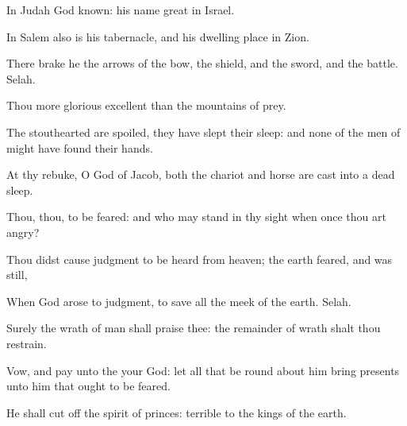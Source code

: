 {\Q {}In
Judah
{}
God
known: his
name
{}
great in
Israel.


\par }{\Q {}In
Salem also is his
tabernacle, and his dwelling
place in
Zion.


\par }{\Q {}There
brake he the
arrows of the
bow, the
shield, and the
sword, and the
battle.
Selah.


\par }{\Q {}Thou
{} more
glorious
{}
excellent than the
mountains of
prey.


\par }{\Q {}The
stouthearted are
spoiled, they have
slept their
sleep: and none of the
men of
might have
found their
hands.


\par }{\Q {}At thy
rebuke, O
God of
Jacob, both the
chariot and
horse are cast into a dead
sleep.


\par }{\BB \par }
{\Q {}Thou,
{} thou,
{} to be
feared: and who may
stand in thy
sight
when once thou art
angry?


\par }{\Q {}Thou didst cause
judgment to be
heard from
heaven; the
earth
feared, and was
still,


\par }{\Q {}When
God
arose to
judgment, to
save all the
meek of the
earth.
Selah.


\par }{\Q {}Surely the
wrath of
man shall
praise thee: the
remainder of
wrath shalt thou
restrain.


\par }{\Q {}Vow, and
pay unto the
{} your
God: let all that be round
about him
bring
presents unto him that ought to be
feared.


\par }{\Q {}He shall cut
off the
spirit of
princes:
{}
terrible to the
kings of the
earth.




\par }
